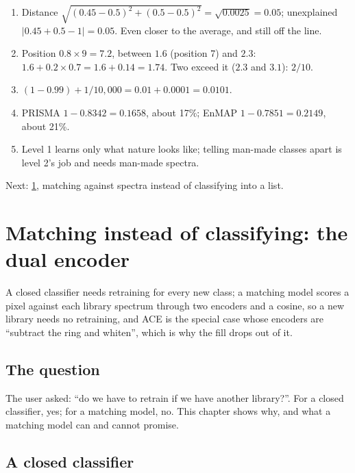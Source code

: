 \documentclass[11pt,a4paper,oneside,openany]{book}
\newcommand{\nextchapter}[1]{\par\medskip\noindent\hfill\textsf{\small Next: #1}\par}
\begin{document}
\begin{answers}
\begin{enumerate}
\item Distance $\sqrt{(0.45-0.5)^2+(0.5-0.5)^2}=\sqrt{0.0025}=0.05$; unexplained $|0.45+0.5-1|=0.05$. Even closer to the average, and still off the line.
\item Position $0.8\times9=7.2$, between $1.6$ (position 7) and $2.3$: $1.6+0.2\times0.7=1.6+0.14=1.74$. Two exceed it ($2.3$ and $3.1$): $2/10$.
\item $(1-0.99)+1/10{,}000=0.01+0.0001=0.0101$.
\item PRISMA $1-0.8342=0.1658$, about 17\%; EnMAP $1-0.7851=0.2149$, about 21\%.
\item Level 1 learns only what nature looks like; telling man-made classes apart is level 2's job and needs man-made spectra.
\end{enumerate}
\end{answers}

\nextchapter{\cref{ch:dualenc}, matching against spectra instead of classifying into a list.}
\chapter{Matching instead of classifying: the dual encoder}
\label{ch:dualenc}

\begin{onething}
A closed classifier needs retraining for every new class; a matching model scores a pixel against each library spectrum through two encoders and a cosine, so a new
library needs no retraining, and ACE is the special case whose encoders are ``subtract the ring and whiten'', which is why the fill drops out of it.
\end{onething}

\section{The question}

The user asked: ``do we have to retrain if we have another library?''. For a closed classifier, yes; for a matching model, no. This chapter shows why, and what a
matching model can and cannot promise.

\section{A closed classifier}
\end{document}
